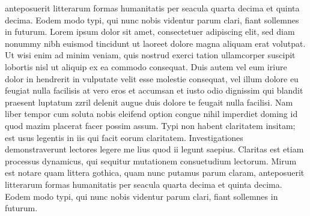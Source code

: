 \documentclass[12pt,a4paper, twoside]{report} %
\begin{document}
anteposuerit litterarum formas humanitatis per seacula quarta decima et quinta decima. Eodem modo typi, qui nunc nobis videntur parum clari, fiant sollemnes in futurum. Lorem ipsum dolor sit amet, consectetuer adipiscing elit, sed diam nonummy nibh euismod tincidunt ut laoreet dolore magna aliquam erat volutpat. Ut wisi enim ad minim veniam, quis nostrud exerci tation ullamcorper suscipit lobortis nisl ut aliquip ex ea commodo consequat. Duis autem vel eum iriure dolor in hendrerit in vulputate velit esse molestie consequat, vel illum dolore eu feugiat nulla facilisis at vero eros et accumsan et iusto odio dignissim qui blandit praesent luptatum zzril delenit augue duis dolore te feugait nulla facilisi. Nam liber tempor cum soluta nobis eleifend option congue nihil imperdiet doming id quod mazim placerat facer possim assum. Typi non habent claritatem insitam; est usus legentis in iis qui facit eorum claritatem. Investigationes demonstraverunt lectores legere me lius quod ii legunt saepius. Claritas est etiam processus dynamicus, qui sequitur mutationem consuetudium lectorum. Mirum est notare quam littera gothica, quam nunc putamus parum claram, anteposuerit litterarum formas humanitatis per seacula quarta decima et quinta decima. Eodem modo typi, qui nunc nobis videntur parum clari, fiant sollemnes in futurum.


~\cite{HarPeled98}
~\cite{EdeKirSei83}
~\cite{RoussillonL11}
~\cite{IB-C992511}



\end{document}
